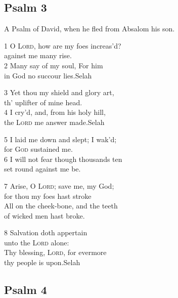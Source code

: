 \begin{center}
\quad{}\quad{}
\end{center}

\subsection*{Psalm 3}

A Psalm of David, when he fled from Absalom his son.

1 O \textsc{Lord}, how are my foes increas’d?\\
against me many rise.\\
2 Many say of my soul, For him\\
in God no succour lies.\hfill Selah

3 Yet thou my shield and glory art,\\
th’ uplifter of mine head.\\
4 I cry’d, and, from his holy hill,\\
the \textsc{Lord} me answer made.\hfill Selah

5 I laid me down and slept; I wak’d;\\
for \textsc{God} sustained me.\\
6 I will not fear though thousands ten\\
set round against me be.

7 Arise, O \textsc{Lord}; save me, my God;\\
for thou my foes hast stroke\\
All on the cheek-bone, and the teeth\\
of wicked men hast broke.

8 Salvation doth appertain\\
unto the \textsc{Lord} alone:\\
Thy blessing, \textsc{Lord}, for evermore\\
thy people is upon.\hfill Selah

\begin{center}
\quad{}\quad{}
\end{center}


\subsection*{Psalm 4 }


